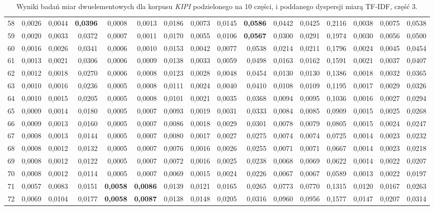 \begin{table}[htp!]
\begin{adjustwidth}{-2cm}{}
\begin{tabular}{ l | *{15}{| r}}
58	&	0,0026	&	0,0044	&	\textbf{0,0396}	&	0,0008	&	0,0013	&	0,0186	&	0,0073	&	0,0145	&	\textbf{0,0586}	&	0,0442	&	0,0425	&	0,2116	&	0,0038	&	0,0075	&	0,0538	\\
59	&	0,0020	&	0,0033	&	0,0372	&	0,0007	&	0,0011	&	0,0170	&	0,0055	&	0,0106	&	\textbf{0,0567}	&	0,0300	&	0,0291	&	0,1974	&	0,0030	&	0,0056	&	0,0500	\\
60	&	0,0016	&	0,0026	&	0,0341	&	0,0006	&	0,0010	&	0,0153	&	0,0042	&	0,0077	&	0,0538	&	0,0214	&	0,0211	&	0,1796	&	0,0024	&	0,0045	&	0,0454	\\
61	&	0,0013	&	0,0021	&	0,0306	&	0,0006	&	0,0009	&	0,0138	&	0,0033	&	0,0059	&	0,0498	&	0,0163	&	0,0162	&	0,1591	&	0,0021	&	0,0037	&	0,0407	\\
62	&	0,0012	&	0,0018	&	0,0270	&	0,0006	&	0,0008	&	0,0123	&	0,0028	&	0,0048	&	0,0454	&	0,0130	&	0,0130	&	0,1386	&	0,0018	&	0,0032	&	0,0365	\\
63	&	0,0010	&	0,0016	&	0,0236	&	0,0005	&	0,0008	&	0,0111	&	0,0024	&	0,0040	&	0,0410	&	0,0108	&	0,0109	&	0,1195	&	0,0017	&	0,0029	&	0,0326	\\
64	&	0,0010	&	0,0015	&	0,0205	&	0,0005	&	0,0008	&	0,0101	&	0,0021	&	0,0035	&	0,0368	&	0,0094	&	0,0095	&	0,1036	&	0,0016	&	0,0027	&	0,0294	\\
65	&	0,0009	&	0,0014	&	0,0180	&	0,0005	&	0,0007	&	0,0093	&	0,0019	&	0,0031	&	0,0333	&	0,0084	&	0,0085	&	0,0909	&	0,0015	&	0,0025	&	0,0268	\\
66	&	0,0009	&	0,0013	&	0,0160	&	0,0005	&	0,0007	&	0,0086	&	0,0018	&	0,0029	&	0,0301	&	0,0078	&	0,0079	&	0,0805	&	0,0015	&	0,0024	&	0,0247	\\
67	&	0,0008	&	0,0013	&	0,0144	&	0,0005	&	0,0007	&	0,0080	&	0,0017	&	0,0027	&	0,0275	&	0,0074	&	0,0074	&	0,0725	&	0,0014	&	0,0023	&	0,0232	\\
68	&	0,0008	&	0,0012	&	0,0132	&	0,0005	&	0,0007	&	0,0076	&	0,0016	&	0,0026	&	0,0255	&	0,0071	&	0,0071	&	0,0667	&	0,0014	&	0,0023	&	0,0218	\\
69	&	0,0008	&	0,0012	&	0,0122	&	0,0005	&	0,0007	&	0,0072	&	0,0016	&	0,0025	&	0,0238	&	0,0068	&	0,0069	&	0,0622	&	0,0014	&	0,0022	&	0,0207	\\
70	&	0,0008	&	0,0012	&	0,0114	&	0,0005	&	0,0007	&	0,0069	&	0,0015	&	0,0024	&	0,0226	&	0,0067	&	0,0067	&	0,0589	&	0,0013	&	0,0022	&	0,0197	\\
71	&	0,0057	&	0,0083	&	0,0151	&	\textbf{0,0058}	&	\textbf{0,0086}	&	0,0139	&	0,0121	&	0,0165	&	0,0265	&	0,0773	&	0,0770	&	0,1315	&	0,0120	&	0,0167	&	0,0263	\\
72	&	0,0069	&	0,0104	&	0,0177	&	\textbf{0,0058}	&	\textbf{0,0087}	&	0,0138	&	0,0148	&	0,0205	&	0,0316	&	0,0960	&	0,0956	&	0,1577	&	0,0147	&	0,0207	&	0,0314	\\
	\bottomrule
\end{tabular}
 \end{adjustwidth}
\caption[Wyniki badań miar dwuelementowych dla korpusu \emph{KIPI} podzielonego na 10 części, i poddanego dyspersji miarą TF-IDF, część 3]{Wyniki badań miar dwuelementowych dla korpusu \emph{KIPI} podzielonego na 10 części, i poddanego dyspersji miarą TF-IDF, część 3.}
\label{KIPI_TFIDF_10_part_3}
\end{table}

